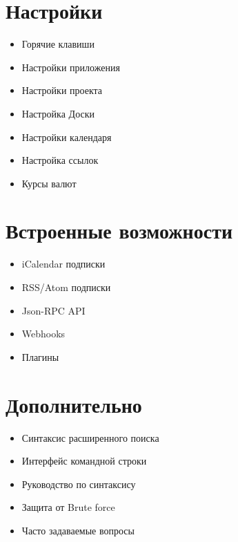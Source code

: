 \documentclass[letterpaper,10pt,russian]{sphinxmanual}
\begin{document}
\section{Настройки}
\label{index:settings}\begin{itemize}
\item {} 
Горячие клавиши

\item {} 
Настройки приложения

\item {} 
Настройки проекта

\item {} 
Настройка Доски

\item {} 
Настройки календаря

\item {} 
Настройка ссылок

\item {} 
Курсы валют

\end{itemize}


\section{Встроенные возможности}
\label{index:integrations}\begin{itemize}
\item {} 
iCalendar подписки

\item {} 
RSS/Atom подписки

\item {} 
Json-RPC API

\item {} 
Webhooks

\item {} 
Плагины

\end{itemize}


\section{Дополнительно}
\label{index:more}\begin{itemize}
\item {} 
Синтаксис расширенного поиска

\item {} 
Интерфейс командной строки

\item {} 
Руководство по синтаксису

\item {} 
Защита от Brute force

\item {} 
Часто задаваемые вопросы

\end{itemize}
\end{document}

